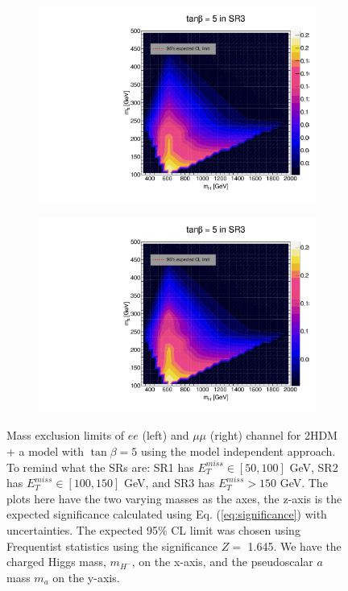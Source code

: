 \documentclass[12pt, a4paper]{book}
\begin{document}
\begin{figure}[!ht]
\begin{subfigure}[b]{0.49\textwidth}
      \includegraphics[width=1\textwidth]{Limits/Model_independent/150/2HDM/2HDM_ee_tb5.pdf}
   \end{subfigure}
   \hfill
   \begin{subfigure}[b]{0.49\textwidth}
      \centering
      \includegraphics[width=1\textwidth]{Limits/Model_independent/150/2HDM/2HDM_uu_tb5.pdf}
   \end{subfigure}
   \caption[Expected mass exclusion limits results for 2HDM + a model with $\tan\beta=5$ on $ee$ and $\mu\mu$ channel using the model independent approach]{Mass exclusion limits of $ee$ (left) and $\mu\mu$ (right) channel for 2HDM + a model with $\tan\beta=5$ using the model independent approach. To remind what the SRs are: SR1 has $E_T^{miss}\in[50, 100]$ GeV, SR2 has $E_T^{miss}\in[100, 150]$ GeV, and SR3 has $E_T^{miss}>150$ GeV. The plots here have the two varying masses as the axes, the z-axis is the expected significance calculated using Eq. (\ref{eq:significance}) with uncertainties. The expected 95\% CL limit was chosen using Frequentist statistics using the significance $Z=$ 1.645.   
   We have the charged Higgs mass, $m_{H^-}$, on the x-axis, and the pseudoscalar $a$ mass $m_{a}$ on the y-axis.}
\end{figure}
\end{document}
